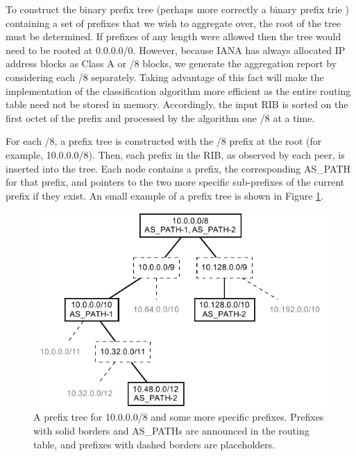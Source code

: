 To construct the binary prefix tree (perhaps more correctly a binary prefix
trie \cite{Wu:2008fk}) containing a set of prefixes that we wish to aggregate
over, the root of the tree must be determined. If prefixes of any length were
allowed then the tree would need to be rooted at 0.0.0.0/0. However, because
IANA has always allocated IP address blocks as Class A or /8 blocks, we
generate the aggregation report by considering each /8 separately. Taking
advantage of this fact will make the implementation of the classification
algorithm more efficient as the entire routing table need not be stored in
memory. Accordingly, the input RIB is sorted on the first octet of the prefix
and processed by the algorithm one /8 at a time.

For each /8, a prefix tree is constructed with the /8 prefix at the root (for
example, 10.0.0.0/8). Then, each prefix in the RIB, as observed by each peer,
is inserted into the tree. Each node contains a prefix, the corresponding
AS\_PATH for that prefix, and pointers to the two more specific sub-prefixes of
the current prefix if they exist. An small example of a prefix tree is shown in
Figure \ref{fig:ex_prefix_tree}.

\begin{figure}
\begin{center}
    \includegraphics{figures/ex_prefix_tree.pdf}
    \caption[A prefix tree]{A prefix tree for 10.0.0.0/8 and some more specific
    prefixes. Prefixes with solid borders and AS\_PATHs are announced in the
    routing table, and prefixes with dashed borders are placeholders.}
    \label{fig:ex_prefix_tree}
\end{center}
\end{figure}

